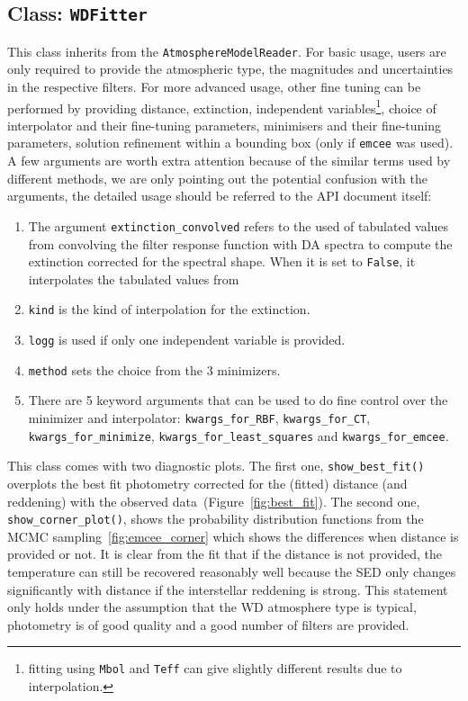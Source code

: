 \documentclass[fleqn,usenatbib]{rasti}
\begin{document}
\subsection{Class: \texttt{WDFitter}}
This class inherits from the \verb+AtmosphereModelReader+. For basic usage,
users are only required to provide the atmospheric type, the magnitudes and
uncertainties in the respective filters. For more advanced usage, other
fine tuning can be performed by providing distance, extinction, independent
variables\footnote{fitting using \texttt{Mbol} and \texttt{Teff} can give slightly
different results due to interpolation.}, choice of interpolator and their
fine-tuning parameters, minimisers and their fine-tuning parameters,
solution refinement within a bounding box (only if \verb+emcee+ was used).
A few arguments are worth extra attention because of the similar terms used
by different methods, we are only pointing out the potential confusion with
the arguments, the detailed usage should be referred to the API document
itself:
\begin{enumerate}
    \item The argument \verb+extinction_convolved+ refers to the used of
    tabulated values from convolving the filter response function with DA
    spectra to compute the extinction corrected for the spectral shape.
    When it is set to \verb+False+, it interpolates the tabulated values
    from \citet{2011ApJ...737..103S}
    \item \verb+kind+ is the kind of interpolation for the extinction.
    \item \verb+logg+ is used if only one independent variable is
    provided.
    \item \verb+method+ sets the choice from the 3 minimizers.
    \item There are 5 keyword arguments that can be used to do fine 
    control over the minimizer and interpolator: \verb+kwargs_for_RBF+,
    \verb+kwargs_for_CT+, \verb+kwargs_for_minimize+,
    \verb+kwargs_for_least_squares+ and \verb+kwargs_for_emcee+.
\end{enumerate}

This class comes with two diagnostic plots. The first one,
\verb+show_best_fit()+ overplots the best fit photometry corrected for the
(fitted) distance (and reddening) with the observed
data~(Figure~\ref{fig:best_fit}). The second one, \verb+show_corner_plot()+,
shows the probability distribution functions from the MCMC
sampling~\ref{fig:emcee_corner} which shows the differences when distance
is provided or not. It is clear from the fit that if the distance is not
provided, the temperature can still be recovered reasonably well because
the SED only changes significantly with distance if the interstellar
reddening is strong. This statement only holds under the assumption that
the WD atmosphere type is typical, photometry is of good quality and a
good number of filters are provided.
\end{document}
